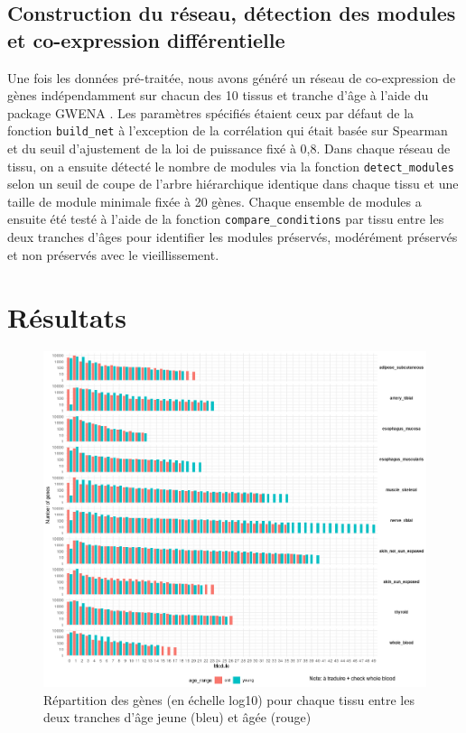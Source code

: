 

\subsection{Construction du réseau, détection des modules et co-expression différentielle}

Une fois les données pré-traitée, nous avons généré un réseau de co-expression de gènes indépendamment sur chacun des 10 tissus et tranche d'âge à l'aide du package GWENA . Les paramètres spécifiés étaient ceux par défaut de la fonction \verb+build_net+ à l'exception de la corrélation qui était basée sur Spearman et du seuil d'ajustement de la loi de puissance fixé à 0,8. Dans chaque réseau de tissu, on a ensuite détecté le nombre de modules via la fonction \verb+detect_modules+ selon un seuil de coupe de l'arbre hiérarchique identique dans chaque tissu et une taille de module minimale fixée à 20 gènes. Chaque ensemble de modules a ensuite été testé à l'aide de la fonction \verb+compare_conditions+ par tissu entre les deux tranches d'âges pour identifier les modules préservés, modérément préservés et non préservés avec le vieillissement.




\section{Résultats}


\begin{figure}[!hb]
    \centering
    \includegraphics[width=1\textwidth]{img/chap2/chap2_repartition_genes_modules_tissus.png}
    \caption{Répartition des gènes (en échelle log10) pour chaque tissu entre les deux tranches d'âge jeune (bleu) et âgée (rouge)}
    \label{figure:repartition_genes_modules_tissus}
\end{figure}


